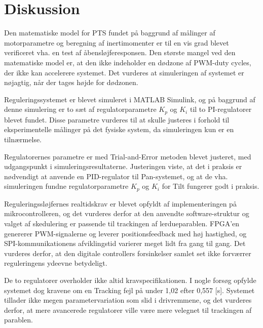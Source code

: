 \section{Diskussion}
\label{sec:diskussion}
Den matematiske model for PTS fundet på baggrund af
målinger af motorparametre og beregning af inertimomenter
er til en vis grad blevet verificeret vha. en test af åbensløjferesponsen.
Den største mangel ved den matematiske model er, at den ikke indeholder en dødzone
af PWM-duty cycles, der ikke kan accelerere systemet. Det vurderes
at simuleringen af systemet er nøjagtig, når der tages højde for dødzonen.

Reguleringssystemet er blevet simuleret i MATLAB Simulink, og på baggrund af denne simulering
er to sæt af regulatorparametre \(K_p\) og \(K_i\) til to PI-regulatorer blevet fundet.
Disse parametre vurderes til at skulle justeres
i forhold til eksperimentelle målinger på det fysiske system, da simuleringen kun er en tilnærmelse.

Regulatorernes parametre er med Trial-and-Error metoden blevet justeret,
med udgangspunkt i simuleringsresultaterne.
Justeringen viste, at det i praksis er nødvendigt at anvende en PID-regulator til Pan-systemet,
og at de vha. simuleringen fundne regulatorparametre \(K_p\) og \(K_i\) for Tilt fungerer godt i praksis.


Reguleringssløjfernes realtidskrav er blevet opfyldt af implementeringen på mikrocontrolleren,
og det vurderes derfor at den anvendte software-struktur og valget af skedulering
er passende til trackingen af lerdueparablen.
FPGA'en genererer PWM-signalerne og leverer positionsfeedback med høj hastighed,
og SPI-kommunikationens afviklingstid varierer meget lidt fra gang til gang.
Det vurderes derfor, at den digitale controllers forsinkelser samlet set ikke forværrer
reguleringens ydeevne betydeligt.

De to regulatorer overholder ikke altid kravspecifikationen.
I nogle forsøg opfylde systemet dog kravene om en Tracking fejl på under 1,02\degree{}
efter 0,557 [s].
Systemet tillader ikke megen parametervariation
som slid i drivremmene,
og det vurderes derfor, at mere avancerede regulatorer ville være mere velegnet til trackingen
af parablen.